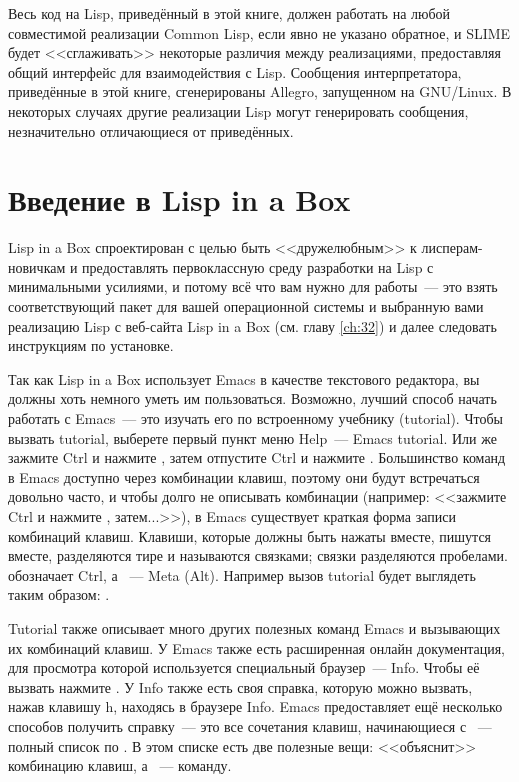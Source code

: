 Весь код на Lisp, приведённый в этой книге, должен работать на любой совместимой
реализации Common Lisp, если явно не указано обратное, и SLIME будет <<сглаживать>>
некоторые различия между реализациями, предоставляя общий интерфейс для взаимодействия с
Lisp. Сообщения интерпретатора, приведённые в этой книге, сгенерированы Allegro,
запущенном на GNU/Linux. В некоторых случаях другие реализации Lisp могут
генерировать сообщения, незначительно отличающиеся от приведённых.

\section{Введение в Lisp in a Box}

Lisp in a Box спроектирован с целью быть <<дружелюбным>> к лисперам-новичкам и предоставлять
первоклассную среду разработки на Lisp с минимальными усилиями, и потому всё что вам нужно
для работы~--- это взять соответствующий пакет для вашей операционной системы и выбранную
вами реализацию Lisp с веб-сайта Lisp in a Box (см. главу \ref{ch:32}) и далее следовать
инструкциям по установке.

Так как Lisp in a Box использует Emacs в качестве текстового редактора, вы должны хоть
немного уметь им пользоваться. Возможно, лучший способ начать работать с Emacs~--- это
изучать его по встроенному учебнику (tutorial). Чтобы вызвать tutorial, выберете первый
пункт меню Help~--- Emacs tutorial. Или же зажмите Ctrl и нажмите , затем отпустите Ctrl и
нажмите . Большинство команд в Emacs доступно через комбинации клавиш, поэтому они будут
встречаться довольно часто, и чтобы долго не описывать комбинации (например: <<зажмите Ctrl
и нажмите , затем...>>), в Emacs существует краткая форма записи комбинаций
клавиш. Клавиши, которые должны быть нажаты вместе, пишутся вместе, разделяются тире и
называются связками; связки разделяются пробелами.  обозначает Ctrl, а ~--- Meta
(Alt). Например вызов tutorial будет выглядеть таким образом: .

Tutorial также описывает много других полезных команд Emacs и вызывающих их комбинаций
клавиш. У Emacs также есть расширенная онлайн документация, для просмотра которой
используется специальный браузер~--- Info. Чтобы её вызвать нажмите . У Info также
есть своя справка, которую можно вызвать, нажав клавишу h, находясь в браузере Info. Emacs
предоставляет ещё несколько способов получить справку~--- это все сочетания клавиш,
начинающиеся с ~--- полный список по . В этом списке есть две
полезные вещи:  <<объяснит>> комбинацию клавиш, а ~--- команду.

